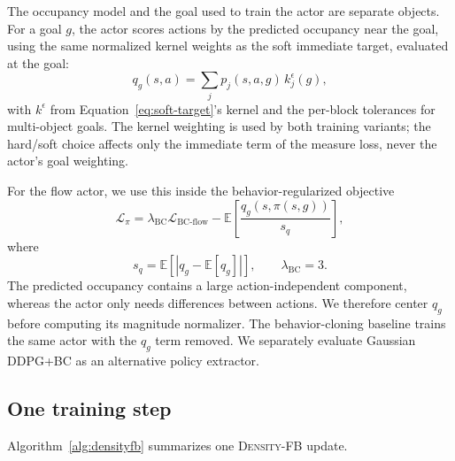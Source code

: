 \documentclass{article}
\newcommand{\E}{\mathbb{E}}
\newcommand{\DensityFB}{\textsc{Density-FB}}
\begin{document}
The occupancy model and the goal used to train the actor are separate objects.
For a goal $g$, the actor scores actions by the predicted occupancy near the goal, using the same normalized kernel weights as the soft immediate target, evaluated at the goal:
\begin{equation}
\label{eq:goal-readout}
q_g(s,a) = \sum_j p_j(s,a,g)\, k_j^\epsilon(g),
\end{equation}
with $k^\epsilon$ from Equation~\ref{eq:soft-target}'s kernel and the per-block tolerances for multi-object goals.
The kernel weighting is used by both training variants; the hard/soft choice affects only the immediate term of the measure loss, never the actor's goal weighting.

For the flow actor, we use this inside the behavior-regularized objective
\begin{equation}
\label{eq:actor}
    \mathcal L_\pi = \lambda_{\mathrm{BC}} \mathcal L_{\mathrm{BC\text{-}flow}} - \E\left[ \frac{ q_g(s,\pi(s,g)) }{s_q} \right],
\end{equation}
where
\begin{equation}
    s_q = \E\left[ \left| q_g-\E[q_g] \right| \right], \qquad \lambda_{\mathrm{BC}}=3.
\end{equation}
The predicted occupancy contains a large action-independent component, whereas the actor only needs differences between actions.
We therefore center $q_g$ before computing its magnitude normalizer.
The behavior-cloning baseline trains the same actor with the $q_g$ term removed.
We separately evaluate Gaussian DDPG+BC as an alternative policy extractor.

\subsection{One training step}
Algorithm~\ref{alg:densityfb} summarizes one \DensityFB{} update.
\end{document}
